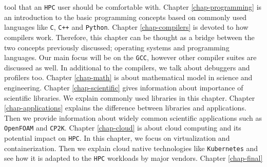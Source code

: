tool that an \texttt{HPC} user should be comfortable with.
\newline \newline 
Chapter \ref{chap-programming} is an introduction to the basic programming concepts
based on commonly used languages like \texttt{C}, \texttt{C++} and \texttt{Python}. 
\newline \newline 
Chapter \ref{chap-compilers} is devoted to how compilers work. Therefore, this chapter can be thought
as a bridge between the two concepts previously discussed; operating systems and programming 
languages. Our main focus will be on the \texttt{GCC}, however other compiler suites are discussed 
as well. In additional to the compilers, we talk about debuggers and profilers too.
\newline \newline 
Chapter \ref{chap-math} is about mathematical model in science and engineering.
\newline \newline 
Chapter \ref{chap-scientific} gives information about importance of scientific libraries. We explain
commonly used libraries in this chapter.
\newline \newline 
Chapter \ref{chap-applications} explains the difference between libraries and applications. Then
we provide information about widely common scientific applications such as \texttt{OpenFOAM} 
and \texttt{CP2K}.
\newline \newline 
Chapter \ref{chap-cloud} is about cloud computing and its potential impact on \texttt{HPC}. In this
chapter, we focus on virtualization and containerization. Then we explain cloud native technologies 
like \texttt{Kubernetes} and see how it is adapted to the \texttt{HPC} workloads by major vendors.
\newline \newline 
Chapter \ref{chap-final}

